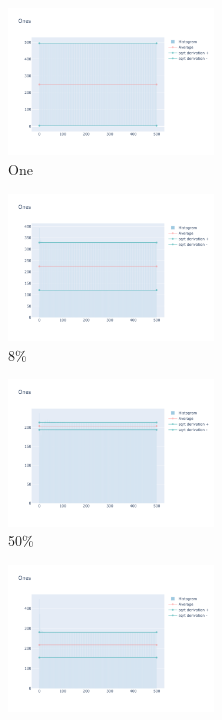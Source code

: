 \documentclass[12pt, fleqn]{report}                             %
\theoremstyle{break}                                            %
\begin{document}
      \begin{figure}[ht!]
        \centering
        \begin{subfigure}[b]{0.4\linewidth}
          \includegraphics[width=0.6\textwidth]{Images/9/dia-a.png}
          \caption{One}
        \end{subfigure}
        \begin{subfigure}[b]{0.4\linewidth}
          \includegraphics[width=0.6\textwidth]{Images/9/dia-b.png}
          \caption{8\%}
        \end{subfigure}
        \begin{subfigure}[b]{0.4\linewidth}
          \includegraphics[width=0.6\textwidth]{Images/9/dia-c.png}
          \caption{50\%}
        \end{subfigure}
        \begin{subfigure}[b]{0.4\linewidth}
          \includegraphics[width=0.6\textwidth]{Images/9/dia-d.png}

\end{subfigure}
\end{figure}
\end{document}
